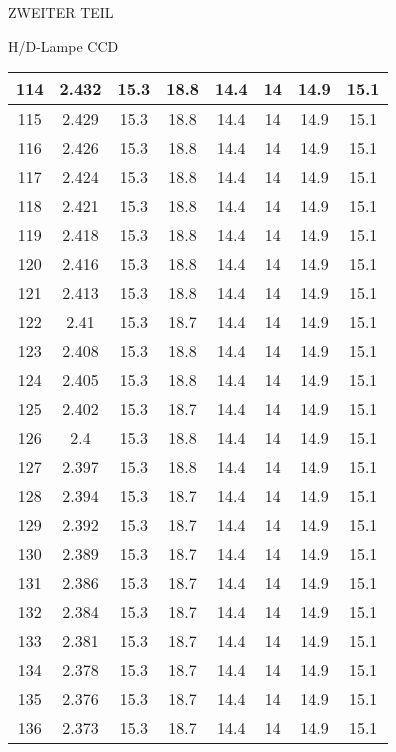 \begin{appendix}
\begin{chapter}{ZWEITER TEIL}
\begin{section}{H/D-Lampe CCD}
\begin{scriptsize}
\begin{longtable}[htbp]{|c|c|c|c|c|c|c|c|}
            114 & 2.432 & 15.3 & 18.8 & 14.4 & 14 & 14.9 & 15.1 \\ \hline
            115 & 2.429 & 15.3 & 18.8 & 14.4 & 14 & 14.9 & 15.1 \\ \hline
            116 & 2.426 & 15.3 & 18.8 & 14.4 & 14 & 14.9 & 15.1 \\ \hline
            117 & 2.424 & 15.3 & 18.8 & 14.4 & 14 & 14.9 & 15.1 \\ \hline
            118 & 2.421 & 15.3 & 18.8 & 14.4 & 14 & 14.9 & 15.1 \\ \hline
            119 & 2.418 & 15.3 & 18.8 & 14.4 & 14 & 14.9 & 15.1 \\ \hline
            120 & 2.416 & 15.3 & 18.8 & 14.4 & 14 & 14.9 & 15.1 \\ \hline
            121 & 2.413 & 15.3 & 18.8 & 14.4 & 14 & 14.9 & 15.1 \\ \hline
            122 & 2.41 & 15.3 & 18.7 & 14.4 & 14 & 14.9 & 15.1 \\ \hline
            123 & 2.408 & 15.3 & 18.8 & 14.4 & 14 & 14.9 & 15.1 \\ \hline
            124 & 2.405 & 15.3 & 18.8 & 14.4 & 14 & 14.9 & 15.1 \\ \hline
            125 & 2.402 & 15.3 & 18.7 & 14.4 & 14 & 14.9 & 15.1 \\ \hline
            126 & 2.4 & 15.3 & 18.8 & 14.4 & 14 & 14.9 & 15.1 \\ \hline
            127 & 2.397 & 15.3 & 18.8 & 14.4 & 14 & 14.9 & 15.1 \\ \hline
            128 & 2.394 & 15.3 & 18.7 & 14.4 & 14 & 14.9 & 15.1 \\ \hline
            129 & 2.392 & 15.3 & 18.7 & 14.4 & 14 & 14.9 & 15.1 \\ \hline
            130 & 2.389 & 15.3 & 18.7 & 14.4 & 14 & 14.9 & 15.1 \\ \hline
            131 & 2.386 & 15.3 & 18.7 & 14.4 & 14 & 14.9 & 15.1 \\ \hline
            132 & 2.384 & 15.3 & 18.7 & 14.4 & 14 & 14.9 & 15.1 \\ \hline
            133 & 2.381 & 15.3 & 18.7 & 14.4 & 14 & 14.9 & 15.1 \\ \hline
            134 & 2.378 & 15.3 & 18.7 & 14.4 & 14 & 14.9 & 15.1 \\ \hline
            135 & 2.376 & 15.3 & 18.7 & 14.4 & 14 & 14.9 & 15.1 \\ \hline
            136 & 2.373 & 15.3 & 18.7 & 14.4 & 14 & 14.9 & 15.1 \\ \hline

\end{longtable}
\end{scriptsize}
\end{section}
\end{chapter}
\end{appendix}
